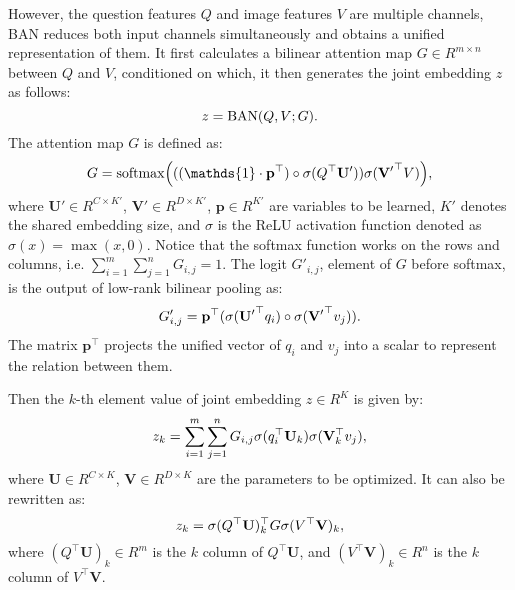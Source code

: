 \documentclass[10pt,twocolumn,letterpaper]{article}
\begin{document}
However, the question features $Q$ and image features $V$ are multiple channels, BAN \cite{kim2018bilinear} reduces both input channels simultaneously and obtains a unified representation of them. It first calculates a bilinear attention map $G \in R^{m \times n}$ between $Q$ and $V$, conditioned on which, it then generates the joint embedding $z$ as follows:
\vspace{-5pt}
\begin{equation} \label{eq:ban1}
z = \mathrm{BAN}(Q, V; G).
\vspace{-5pt}
\end{equation}
The attention map $G$ is defined as:
\vspace{-5pt}
\begin{equation} \label{eq:ban2}
G =\mathrm{softmax}\Big(((\mathds{1} \cdot \mathbf{p}^\top) \circ \sigma(Q^\top \mathbf{U'})) \sigma(\mathbf{V'}^\top V) \Big),
\vspace{-5pt}
\end{equation}
where $\mathbf{U'} \in R^{C \times K'}$, $\mathbf{V'} \in R^{D \times K'}$, $\mathbf{p} \in R^{K'}$ are variables to be learned, $K'$ denotes the shared embedding size, and $\sigma$ is the ReLU activation function denoted as $\sigma(x)=\max(x,0)$. Notice that the softmax function works on the rows and columns, i.e. $\sum_{i=1}^{m}\sum_{j=1}^{n}G_{i,j} = 1$. The logit $G'_{i,j}$, element of $G$ before softmax, is the output of low-rank bilinear pooling as:
\vspace{-5pt}
\begin{equation} \label{eq:hahadamard}
G'_{i,j} = \mathbf{p}^\top (\sigma(\mathbf{U'}^\top q_i) \circ \sigma(\mathbf{V'}^\top v_j)).
\vspace{-5pt}
\end{equation}
The matrix $\mathbf{p}^\top$ projects the unified vector of $q_i$ and $v_j$ into a scalar to represent the relation between them.

Then the $k$-th element value of joint embedding $z \in R^K$ is given by:
\vspace{-5pt}
\begin{equation}
z_k = \sum_{i=1}^{m}\sum_{j=1}^{n}G_{i,j}\sigma(q_i^\top \mathbf{U}_k)\sigma(\mathbf{V}_k^\top v_j),
\vspace{-5pt}
\end{equation}
where $\mathbf{U} \in R^{C \times K}$, $\mathbf{V} \in R^{D \times K}$ are the parameters to be optimized. It can also be rewritten as:
\vspace{-5pt}
\begin{equation} \label{eq:ban3}
z_k = \sigma(Q^\top \mathbf{U})^\top_k G \sigma(V^\top \mathbf{V})_k,
\vspace{-5pt}
\end{equation}
where $(Q^\top \mathbf{U})_k \in R^m$ is the $k$ column of $Q^\top \mathbf{U}$, and $(V^\top \mathbf{V})_k \in R^n$ is the $k$ column of $V^\top \mathbf{V}$. 
\end{document}
